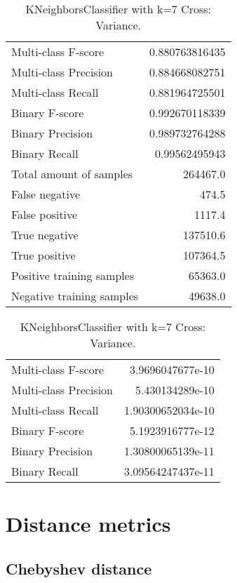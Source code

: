 \begin{table}[H]
\begin{minipage}{0.5\textwidth}
\caption{KNeighborsClassifier with k=7 Cross: Average.}
\centering
\begin{tabular}{l r}
\toprule
Multi-class F-score & 0.880763816435 \\
Multi-class Precision & 0.884668082751 \\
Multi-class Recall & 0.881964725501 \\
\midrule
Binary F-score & 0.992670118339 \\
Binary Precision & 0.989732764288 \\
Binary Recall & 0.99562495943 \\
\midrule
Total amount of samples & 264467.0 \\
False negative & 474.5 \\
False positive & 1117.4 \\
True negative & 137510.6 \\
True positive & 107364.5 \\
\midrule
Positive training samples & 65363.0 \\
Negative training samples & 49638.0 \\
\bottomrule
\end{tabular}
\end{minipage}
\hfillx
\begin{minipage}{0.5\textwidth}
\caption{KNeighborsClassifier with k=7 Cross: Variance.}
\centering
\begin{tabular}{l r}
\toprule
Multi-class F-score & 3.9696047677e-10 \\
Multi-class Precision & 5.430134289e-10 \\
Multi-class Recall & 1.90300652034e-10 \\
\midrule
Binary F-score & 5.1923916777e-12 \\
Binary Precision & 1.30800065139e-11 \\
Binary Recall & 3.09564247437e-11 \\
\bottomrule
\end{tabular}
\end{minipage}
\end{table}

\newpage
\section{Distance metrics}
\subsection{Chebyshev distance}

